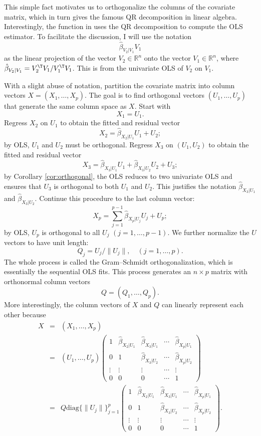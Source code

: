 This simple fact motivates us to orthogonalize the columns of the covariate matrix, which in turn gives the famous QR decomposition in linear algebra. Interestingly, the  function in  uses the QR decomposition to compute the OLS estimator. To facilitate the discussion, I will use the notation
$$
 \hat{\beta}_{V_2|V_1} V_1
$$
as the linear projection of the vector $V_2 \in \mathbb{R}^n$ onto the vector $V_1 \in \mathbb{R}^n$, where $\hat{\beta}_{V_2|V_1}  =  V_2^{\T} V_1  /   V_1^{\T} V_1 $.
 This is from the univariate OLS of $V_2$ on $ V_1$. 



With a slight abuse of notation, partition the covariate matrix into column vectors $X = (X_1, \ldots, X_p)$. The goal is to find orthogonal vectors $(U_1, \ldots, U_p)$ that generate the same column space as $X$.  
Start with 
$$
X_1 = U_1.
$$ 
Regress $X_2$ on $U_1$ to obtain the fitted and residual vector  
$$
X_2 = \hat{\beta}_{X_2|U_1} U_1  + U_2; 
$$
by OLS, $U_1$ and $U_2$ must be orthogonal. 
Regress $X_3$ on $(U_1, U_2)$ to obtain the fitted and residual vector  
 $$
X_3 = \hat{\beta}_{X_3|U_1} U_1 +   \hat{\beta}_{X_3|U_2} U_2 + U_3; 
$$
by Corollary \ref{cor:orthogonal}, the OLS reduces to two univariate OLS and ensures that $U_3$ is orthogonal to both $U_1$ and $U_2$.  This justifies the notation $\hat{\beta}_{X_3|U_1} $ and $\hat{\beta}_{X_3|U_2}$. Continue this procedure to the last column vector:
$$
X_p = \sum_{j=1}^{p-1} \hat{\beta}_{X_p|U_j} U_j + U_p;
$$
by OLS, $U_p$ is orthogonal to all $U_j$ $(j=1,\ldots, p-1)$. We further normalize the $U$ vectors to have unit length:
$$
Q_j = U_j / \|  U_j \|,\quad (j= 1, \ldots, p).
$$
The whole process is called the Gram--Schmidt orthogonalization, which is essentially the sequential OLS fits. This process generates an $n\times p$ matrix with orthonormal column vectors 
$$
Q = (Q_1, \ldots, Q_p). 
$$
More interestingly, the column vectors of $X$ and $Q$ can linearly represent each other because 
\begin{eqnarray*}
X &=&  (X_1, \ldots, X_p) \\
&=& (U_1, \ldots, U_p) \begin{pmatrix}
1 & \hat{\beta}_{X_2|U_1} & \hat{\beta}_{X_3|U_1} &\cdots & \hat{\beta}_{X_p|U_1} \\
0& 1& \hat{\beta}_{X_3|U_2} &\cdots & \hat{\beta}_{X_p|U_2} \\
\vdots & \vdots & \vdots & \cdots & \vdots \\
0&0&0& \cdots & 1
\end{pmatrix} \\
&=& Q
\text{diag}\{ \|  U_j \| \}_{j=1}^p
\begin{pmatrix}
1 & \hat{\beta}_{X_2|U_1} & \hat{\beta}_{X_3|U_1} &\cdots & \hat{\beta}_{X_p|U_1} \\
0& 1& \hat{\beta}_{X_3|U_2} &\cdots & \hat{\beta}_{X_p|U_2} \\
\vdots & \vdots & \vdots & \cdots & \vdots \\
0&0&0& \cdots & 1
\end{pmatrix}  . 
\end{eqnarray*}
